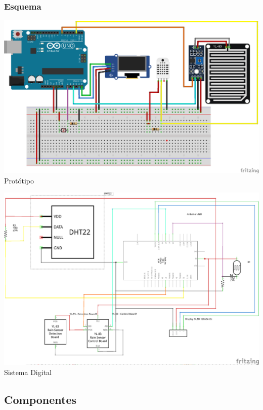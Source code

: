 \documentclass[12pt,a4paper,portrait]{article}
\begin{document}
			\subsubsection{Esquema}
				\begin{center}
				\includegraphics[scale=0.6]{./img/view.png}
				Protótipo\\
			\end{center}
			\begin{center}
				\includegraphics[scale=0.75]{./img/esquema.png}
				Sistema Digital\\	
			\end{center}
			

		\subsection{Componentes}		
\end{document}
